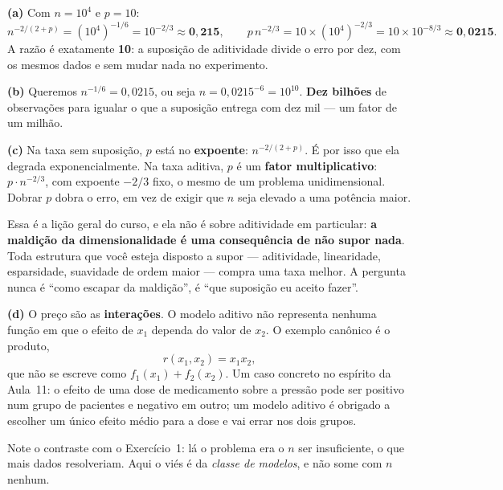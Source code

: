 \documentclass[11pt,a4paper]{article}
\begin{document}
\begin{solucao}
\textbf{(a)} Com $n=10^4$ e $p=10$:
\[
  n^{-2/(2+p)} = (10^4)^{-1/6} = 10^{-2/3} \approx \mathbf{0{,}215},
  \qquad
  p\,n^{-2/3} = 10\times(10^4)^{-2/3} = 10\times 10^{-8/3} \approx \mathbf{0{,}0215}.
\]
A razão é exatamente \textbf{10}: a suposição de aditividade divide o erro por
dez, com os mesmos dados e sem mudar nada no experimento.

\smallskip
\textbf{(b)} Queremos $n^{-1/6}=0{,}0215$, ou seja $n=0{,}0215^{-6}=10^{10}$.
\textbf{Dez bilhões} de observações para igualar o que a suposição entrega com
dez mil --- um fator de um milhão.

\smallskip
\textbf{(c)} Na taxa sem suposição, $p$ está no \textbf{expoente}:
$n^{-2/(2+p)}$. É por isso que ela degrada exponencialmente. Na taxa aditiva, $p$
é um \textbf{fator multiplicativo}: $p\cdot n^{-2/3}$, com expoente $-2/3$ fixo,
o mesmo de um problema unidimensional. Dobrar $p$ dobra o erro, em vez de exigir
que $n$ seja elevado a uma potência maior.

Essa é a lição geral do curso, e ela não é sobre aditividade em particular:
\textbf{a maldição da dimensionalidade é uma consequência de não supor nada}.
Toda estrutura que você esteja disposto a supor --- aditividade, linearidade,
esparsidade, suavidade de ordem maior --- compra uma taxa melhor. A pergunta
nunca é ``como escapar da maldição'', é ``que suposição eu aceito fazer''.

\smallskip
\textbf{(d)} O preço são as \textbf{interações}. O modelo aditivo não representa
nenhuma função em que o efeito de $x_1$ dependa do valor de $x_2$. O exemplo
canônico é o produto,
\[
  r(x_1,x_2) = x_1 x_2 ,
\]
que não se escreve como $f_1(x_1)+f_2(x_2)$. Um caso concreto no espírito da
Aula~11: o efeito de uma dose de medicamento sobre a pressão pode ser positivo
num grupo de pacientes e negativo em outro; um modelo aditivo é obrigado a
escolher um único efeito médio para a dose e vai errar nos dois grupos.

Note o contraste com o Exercício~1: lá o problema era o $n$ ser insuficiente,
o que mais dados resolveriam. Aqui o viés é da \emph{classe de modelos}, e não
some com $n$ nenhum.
\end{solucao}
\end{document}
